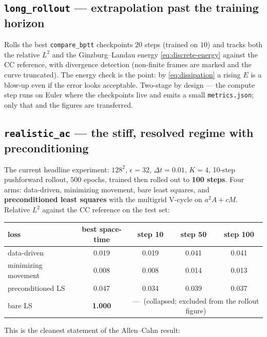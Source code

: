 \documentclass[11pt]{article}
\newcommand{\dt}{\Delta t}
\begin{document}
\subsection{\texttt{long\_rollout} --- extrapolation past the training horizon}
Rolls the best \texttt{compare\_bptt} checkpoints $20$ steps (trained on $10$) and tracks both the
relative $L^2$ and the Ginzburg--Landau energy \eqref{eq:discrete-energy} against the CC reference,
with divergence detection (non-finite frames are marked and the curve truncated). The energy check
is the point: by \eqref{eq:dissipation} a rising $E$ is a blow-up even if the error looks
acceptable. Two-stage by design --- the compute step runs on Euler where the checkpoints live and
emits a small \texttt{metrics.json}; only that and the figures are transferred.

\subsection{\texttt{realistic\_ac} --- the stiff, resolved regime with preconditioning}
\label{sec:exp-realistic}
The current headline experiment: $128^2$, $\epsilon=32$, $\dt=0.01$, $K=4$, 10-step pushforward
rollout, $500$ epochs, trained then rolled out to \textbf{100 steps}. Four arms: data-driven,
minimizing movement, bare least squares, and \textbf{preconditioned least squares} with the
multigrid V-cycle on $a^2A+cM$. Relative $L^2$ against the CC reference on the test set:
\begin{center}
\begin{tabular}{lcccc}
\hline
loss & best space-time & step 10 & step 50 & step 100 \\
\hline
data-driven                & 0.019 & 0.019 & 0.041 & 0.041 \\
minimizing movement        & 0.008 & 0.008 & 0.014 & 0.013 \\
preconditioned LS          & 0.047 & 0.034 & 0.039 & 0.037 \\
bare LS                    & \textbf{1.000} & \multicolumn{3}{c}{---\ (collapsed; excluded from the rollout figure)} \\
\hline
\end{tabular}
\end{center}
This is the cleanest statement of the Allen--Cahn result:
\end{document}
